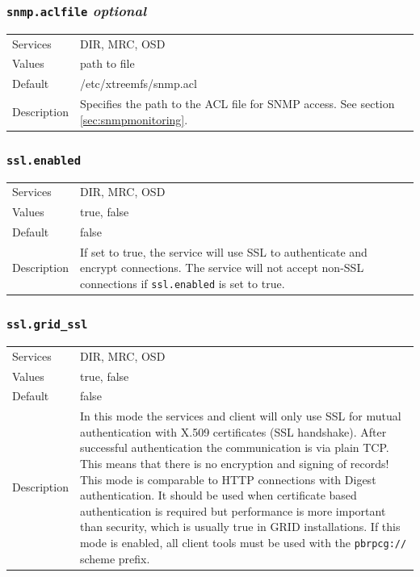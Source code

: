 \documentclass[a4paper,10pt]{book}
\begin{document}
\subsubsection{\texttt{snmp.aclfile} \textit{optional}}
\begin{tabular}{lp{10cm}}
 Services & DIR, MRC, OSD\\
 Values   & path to file\\
 Default  & /etc/xtreemfs/snmp.acl\\
 Description & Specifies the path to the ACL file for SNMP access. See section \ref{sec:snmpmonitoring}.
\end{tabular}

\subsubsection{\texttt{ssl.enabled}}
\begin{tabular}{lp{10cm}}
 Services & DIR, MRC, OSD\\
 Values   & true, false \\
 Default  & false \\
 Description & If set to true, the service will use SSL to authenticate and encrypt connections. The service will not accept non-SSL connections if \texttt{ssl.enabled} is set to true.
\end{tabular}

\subsubsection{\texttt{ssl.grid\_ssl}}
\begin{tabular}{lp{10cm}}
 Services & DIR, MRC, OSD\\
 Values   & true, false \\
 Default  & false \\
 Description & In this mode the services and client will only use SSL for mutual authentication with X.509 certificates (SSL handshake). After successful authentication the communication is via plain TCP. This means that there is no encryption and signing of records! This mode is comparable to HTTP connections with Digest authentication. It should be used when certificate based authentication is required but performance is more important than security, which is usually true in GRID installations. If this mode is enabled, all client tools must be used with the \texttt{pbrpcg://} scheme prefix.
\end{tabular}
\end{document}
